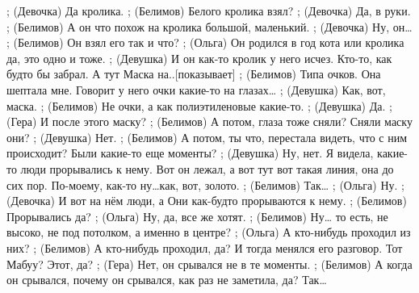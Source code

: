 ;	(Девочка) Да кролика.
;	(Белимов) Белого кролика взял?
;	(Девочка) Да, в руки.
;	(Белимов) А он что похож на кролика большой, маленький.
;	(Девочка) Ну, он…
;	(Белимов) Он взял его так и что?
;	(Ольга) Он родился в год кота или кролика да, это одно и тоже.
;	(Девушка) И он как-то кролик у него исчез. Кто-то, как будто бы забрал. А тут Маска на..[показывает]
;	(Белимов)  Типа очков. Она шептала мне. Говорит у него очки какие-то на глазах…
;	(Девушка) Как, вот, маска.
;	(Белимов) Не очки, а как полиэтиленовые какие-то.
;	(Девушка) Да.
;	(Гера) И после этого маску?
;	(Белимов) А потом, глаза тоже сняли? Сняли маску они?
;	(Девушка) Нет.
;	(Белимов) А потом, ты что, перестала видеть, что с ним происходит? Были какие-то еще моменты?
;	(Девушка) Ну, нет. Я видела, какие-то люди прорывались к нему. Вот он лежал, а вот тут вот такая линия,  она до сих пор. По-моему, как-то ну…как, вот, золото.
;	(Белимов) Так…
;	(Ольга) Ну.
;	(Девочка) И вот на нём люди, а Они как-будто прорываются к нему.
;	(Белимов) Прорывались да?
;	(Ольга) Ну, да, все же хотят.
;	(Белимов) Ну… то есть, не высоко, не под потолком, а именно в центре?
;	(Ольга) А кто-нибудь проходил из них?
;	(Белимов) А кто-нибудь проходил, да? И тогда менялся его разговор. Тот Мабуу? Этот, да?
;	(Гера) Нет, он срывался не в те моменты.
;	(Белимов) А когда он срывался, почему он срывался, как раз не заметила, да? Так…

